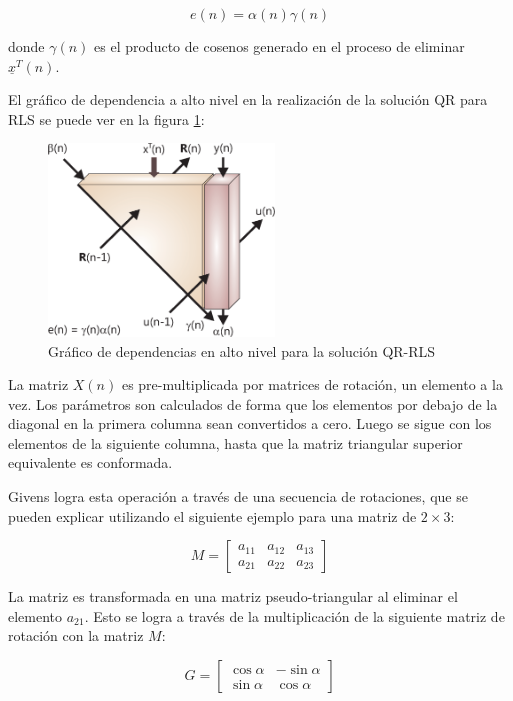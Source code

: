 \[
e(n) = \alpha(n)\gamma(n)
\]

donde $\gamma(n)$ es el producto de cosenos generado en el proceso de eliminar $\underline{x}^T(n)$.

El gráfico de dependencia a alto nivel en la realización de la solución QR para RLS se puede ver en la figura \ref{fig:dependence_graph}:

\begin{figure}[h!]
        \centering
        \includegraphics[width=6cm]{./figures/C03-dependence_graph}
        \caption{Gráfico de dependencias en alto nivel para la solución QR-RLS}
        \label{fig:dependence_graph}
\end{figure}

La matriz $X(n)$ es pre-multiplicada por matrices de rotación, un elemento a la vez. Los parámetros son calculados de forma que los elementos por debajo de la diagonal en la primera columna sean convertidos a cero. Luego se sigue con los elementos de la siguiente columna, hasta que la matriz triangular superior equivalente es conformada.

Givens logra esta operación a través de una secuencia de rotaciones, que se pueden explicar utilizando el siguiente ejemplo para una matriz de $2\times3$:

\[
M=
	\left[
		\begin{array}{ccc}
			a_{11} & a_{12} & a_{13} \\
			a_{21} & a_{22} & a_{23}
		\end{array}
	\right]
\]

La matriz es transformada en una matriz pseudo-triangular al eliminar el elemento $a_{21}$. Esto se logra a través de la multiplicación de la siguiente matriz de rotación con la matriz $M$:

\[
G=
	\left[
		\begin{array}{cc}
			 \cos\alpha & -\sin\alpha\\
			 \sin\alpha &  \cos\alpha
		\end{array}
	\right]
\]

